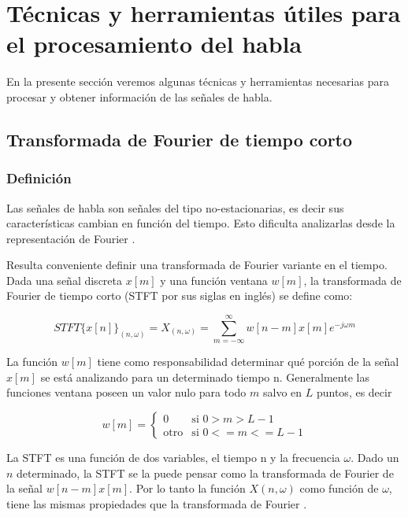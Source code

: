 \section{Técnicas y herramientas útiles para el procesamiento del habla}

En la presente sección veremos algunas técnicas y herramientas necesarias para procesar y obtener información de las señales de habla.

\subsection{Transformada de Fourier de tiempo corto}
\label{sec:stft}

\subsubsection{Definición}

Las señales de habla son señales del tipo no-estacionarias, es decir sus características cambian en función del tiempo. Esto dificulta analizarlas desde la representación de Fourier \cite{spoken_language_processing,speech_enhancement_theory_and_practice}.

Resulta conveniente definir una transformada de Fourier variante en el tiempo. Dada una señal discreta $x[m]$ y una función ventana $w[m]$, la transformada de Fourier de tiempo corto (STFT por sus siglas en inglés) se define como:

\begin{equation*}
	STFT\{x[n]\}_{(n, \omega)} = X_{(n, \omega)} = \sum_{m=-\infty}^{\infty} w[n-m]x[m]e^{-j \omega m}
\end{equation*}

La función $w[m]$ tiene como responsabilidad determinar qué porción de la señal $x[m]$ se está analizando para un determinado tiempo n. Generalmente las funciones ventana poseen un valor nulo para todo $m$ salvo en $L$ puntos, es decir

\begin{equation*}
	w[m] = 
	\begin{cases}
		0 & \text{si $0 > m > L - 1$} \\
		\text{otro} & \text{si $0 <= m <= L - 1$}
	\end{cases}
\end{equation*}

La STFT es una función de dos variables, el tiempo n y la frecuencia $\omega$. Dado un $n$ determinado, la STFT se la puede pensar como la transformada de Fourier de la señal $w[n-m] x[m]$. Por lo tanto la función $X(n,\omega)$ como función de $\omega$, tiene las mismas propiedades que la transformada de Fourier \cite{oppenheim_schafer}.

